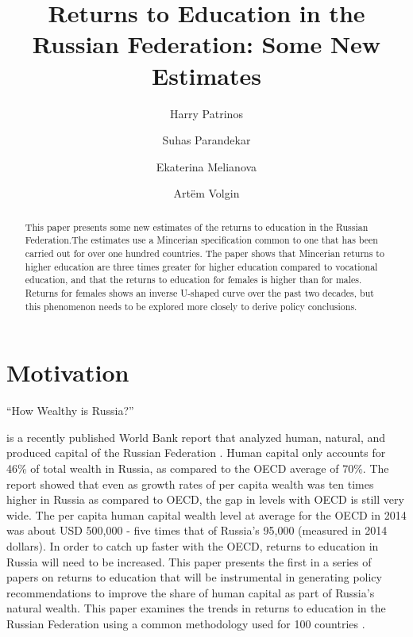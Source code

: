 \documentclass[alpha-refs]{wiley-article-01g}
\title{Returns to Education in the Russian Federation: Some New Estimates}
\author[]{Harry Patrinos}
\author[]{\hspace{-1em}Suhas Parandekar}
\author[]{\hspace{-1em}Ekaterina Melianova}
\author[]{\hspace{-1em}Art\"{e}m Volgin}
\affil[*]{Education Global Practice, Europe and Central Asia}
\begin{document}
\maketitle

\begin{abstract}
This paper presents some new estimates of the returns to education in the Russian Federation.The estimates use a Mincerian specification common to one that has been carried out for over one hundred countries. The paper shows that Mincerian returns to higher education are three times greater for higher education compared to vocational education, and that the returns to education for females is higher than for males. Returns for females shows an inverse U-shaped curve over the past two decades, but this phenomenon needs to be explored more closely to derive policy conclusions. 

\end{abstract}




\section{Motivation}

\begin{em}``How Wealthy is Russia?''\end{em} \hspace{-0.10em}is a recently published World Bank report that analyzed human, natural, and produced capital of the Russian Federation \parencite{Naikal2019}. Human capital only accounts for 46\% of total wealth in Russia, as compared to the OECD average of 70\%.  The report showed that even as growth rates of per capita wealth was ten times higher in Russia as compared to OECD, the gap in levels with OECD is still very wide. The per capita human capital wealth level at average for the OECD in 2014 was about USD 500,000 - five times that of Russia's 95,000 (measured in 2014 dollars). In order to catch up faster with the OECD, returns to education in Russia will need to be increased. This paper presents the first in a series of papers on returns to education that will be instrumental in generating policy recommendations to improve the share of human capital as part of Russia's natural wealth. This paper examines the trends in returns to education in the Russian Federation using a common methodology used for 100 countries \parencite{Montenegro_Patrinos14, Psacharopoulos_Patrinos18}.  
\end{document}
